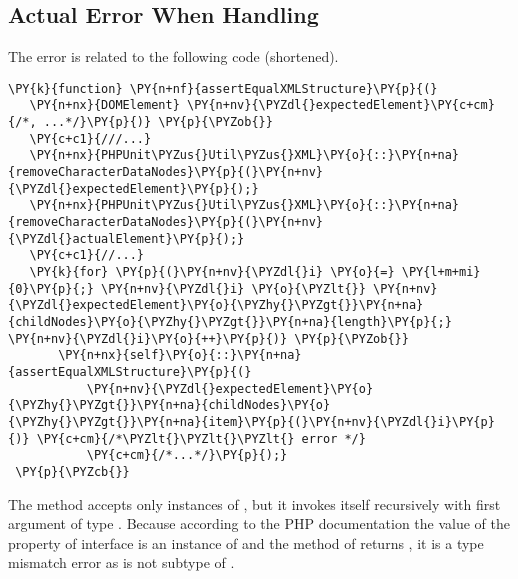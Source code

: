 \subsection{Actual Error When Handling }

The error is related to the following code (shortened).

\begin{Verbatim}[commandchars=\\\{\}]
 \PY{k}{function} \PY{n+nf}{assertEqualXMLStructure}\PY{p}{(}
   \PY{n+nx}{DOMElement} \PY{n+nv}{\PYZdl{}expectedElement}\PY{c+cm}{/*, ...*/}\PY{p}{)} \PY{p}{\PYZob{}}
   \PY{c+c1}{///...}
   \PY{n+nx}{PHPUnit\PYZus{}Util\PYZus{}XML}\PY{o}{::}\PY{n+na}{removeCharacterDataNodes}\PY{p}{(}\PY{n+nv}{\PYZdl{}expectedElement}\PY{p}{);}
   \PY{n+nx}{PHPUnit\PYZus{}Util\PYZus{}XML}\PY{o}{::}\PY{n+na}{removeCharacterDataNodes}\PY{p}{(}\PY{n+nv}{\PYZdl{}actualElement}\PY{p}{);}
   \PY{c+c1}{//...}
   \PY{k}{for} \PY{p}{(}\PY{n+nv}{\PYZdl{}i} \PY{o}{=} \PY{l+m+mi}{0}\PY{p}{;} \PY{n+nv}{\PYZdl{}i} \PY{o}{\PYZlt{}} \PY{n+nv}{\PYZdl{}expectedElement}\PY{o}{\PYZhy{}\PYZgt{}}\PY{n+na}{childNodes}\PY{o}{\PYZhy{}\PYZgt{}}\PY{n+na}{length}\PY{p}{;} \PY{n+nv}{\PYZdl{}i}\PY{o}{++}\PY{p}{)} \PY{p}{\PYZob{}}
       \PY{n+nx}{self}\PY{o}{::}\PY{n+na}{assertEqualXMLStructure}\PY{p}{(}
           \PY{n+nv}{\PYZdl{}expectedElement}\PY{o}{\PYZhy{}\PYZgt{}}\PY{n+na}{childNodes}\PY{o}{\PYZhy{}\PYZgt{}}\PY{n+na}{item}\PY{p}{(}\PY{n+nv}{\PYZdl{}i}\PY{p}{)} \PY{c+cm}{/*\PYZlt{}\PYZlt{}\PYZlt{} error */}
           \PY{c+cm}{/*...*/}\PY{p}{);}
 \PY{p}{\PYZcb{}}
\end{Verbatim}

The method  accepts only instances 
of , but it invokes itself recursively with first 
argument of type . Because according to the 
PHP documentation the value of the  property 
of interface  is an instance of  
and the method  of  
returns , it is a type mismatch error as  
is not subtype of .

